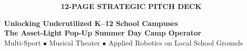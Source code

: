 \documentclass[aspectratio=169,9pt]{beamer}
\begin{document}
\begin{frame}[plain]

\vskip-10pt
\textcolor{white}{\textbf{\normalsize CAMPNEXUS}} \hfill \textcolor{brandGreenAccent}{\textbf{\tiny 12-PAGE STRATEGIC PITCH DECK}}
\vskip14pt

\begin{center}
  {\Large \textbf{\textcolor{brandNavy}{Unlocking Underutilized K--12 School Campuses}}} \\[2pt]
  {\normalsize \textbf{\textcolor{brandEmerald}{The Asset-Light Pop-Up Summer Day Camp Operator}}} \\[3pt]
  \textcolor{brandSlate}{\scriptsize Multi-Sport $\bullet$ Musical Theater $\bullet$ Applied Robotics on Local School Grounds}
\end{center}


\end{frame}
\end{document}
